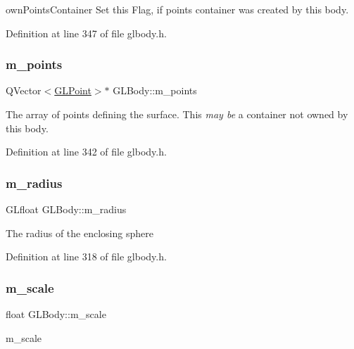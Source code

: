own\+Points\+Container Set this Flag, if points container was created by this body. 



Definition at line 347 of file glbody.\+h.

\mbox{\label{class_g_l_body_a8e157d4bf676d1c5af7f74d30d44ea12}} 
\subsubsection{\texorpdfstring{m\_points}{m\_points}}
{\footnotesize\ttfamily Q\+Vector$<$\mbox{\hyperlink{class_g_l_point}{G\+L\+Point}}$>$$\ast$ G\+L\+Body\+::m\+\_\+points\hspace{0.3cm}{\ttfamily [protected]}}

The array of points defining the surface. This {\itshape may be} a container not owned by this body. 

Definition at line 342 of file glbody.\+h.

\mbox{\label{class_g_l_body_a96006c2b453ffe0490bee1961e61e3b3}} 
\subsubsection{\texorpdfstring{m\_radius}{m\_radius}}
{\footnotesize\ttfamily G\+Lfloat G\+L\+Body\+::m\+\_\+radius\hspace{0.3cm}{\ttfamily [protected]}}

The radius of the enclosing sphere 

Definition at line 318 of file glbody.\+h.

\mbox{\label{class_g_l_body_a82266ebb17e8932521180ca9626c314c}} 
\subsubsection{\texorpdfstring{m\_scale}{m\_scale}}
{\footnotesize\ttfamily float G\+L\+Body\+::m\+\_\+scale\hspace{0.3cm}{\ttfamily [protected]}}



m\+\_\+scale 



